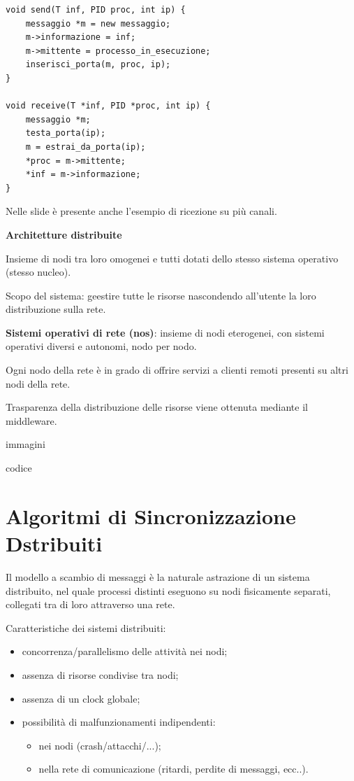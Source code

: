 \documentclass{article}
\begin{document}
\begin{lstlisting}
void send(T inf, PID proc, int ip) {
    messaggio *m = new messaggio;
    m->informazione = inf;
    m->mittente = processo_in_esecuzione;
    inserisci_porta(m, proc, ip);
}

void receive(T *inf, PID *proc, int ip) {
    messaggio *m;
    testa_porta(ip);
    m = estrai_da_porta(ip);
    *proc = m->mittente;
    *inf = m->informazione;
}
\end{lstlisting}

Nelle slide è presente anche l'esempio di ricezione su più canali.

\vspace{5mm}
\textbf{Architetture distribuite}

Insieme di nodi tra loro omogenei e tutti dotati dello stesso sistema operativo (stesso nucleo).

\vspace{3mm}
Scopo del sistema: geestire tutte le risorse nascondendo all'utente la loro distribuzione sulla rete.

\vspace{3mm}
\textbf{Sistemi operativi di rete (nos)}: insieme di nodi eterogenei, con sistemi operativi diversi e autonomi, nodo per nodo.

Ogni nodo della rete è in grado di offrire servizi a clienti remoti presenti su altri nodi della rete.

Trasparenza della distribuzione delle risorse viene ottenuta mediante il middleware.

immagini



codice



\section{Algoritmi di Sincronizzazione Dstribuiti}

Il modello a scambio di messaggi è la naturale astrazione di un sistema distribuito, nel quale processi distinti eseguono su nodi fisicamente separati, collegati tra di loro
attraverso una rete.

Caratteristiche dei sistemi distribuiti:
\begin{itemize}
    \item concorrenza/parallelismo delle attività nei nodi;
    \item assenza di risorse condivise tra nodi;
    \item assenza di un clock globale;
    \item possibilità di malfunzionamenti indipendenti:
    \begin{itemize}
        \item nei nodi (crash/attacchi/...);
        \item nella rete di comunicazione (ritardi, perdite di messaggi, ecc..).
    \end{itemize}
\end{itemize}
\end{document}
